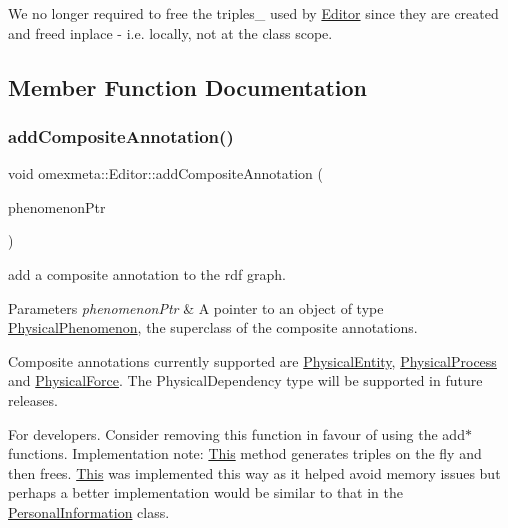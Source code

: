 We no longer required to free the triples\+\_\+ used by \hyperlink{classomexmeta_1_1Editor}{Editor} since they are created and freed inplace -\/ i.\+e. locally, not at the class scope. 

\subsection{Member Function Documentation}
\mbox{\label{classomexmeta_1_1Editor_a146ae84fb44991d9c6135e98f03fa972}} 
\subsubsection{\texorpdfstring{add\+Composite\+Annotation()}{addCompositeAnnotation()}}
{\footnotesize\ttfamily void omexmeta\+::\+Editor\+::add\+Composite\+Annotation (\begin{DoxyParamCaption}\item[{\hyperlink{classomexmeta_1_1PhysicalPhenomenon}{Physical\+Phenomenon} $\ast$}]{phenomenon\+Ptr }\end{DoxyParamCaption})}



add a composite annotation to the rdf graph. 


\begin{DoxyParams}{Parameters}
{\em phenomenon\+Ptr} & A pointer to an object of type \hyperlink{classomexmeta_1_1PhysicalPhenomenon}{Physical\+Phenomenon}, the superclass of the composite annotations.\\
\hline
\end{DoxyParams}
Composite annotations currently supported are \hyperlink{classomexmeta_1_1PhysicalEntity}{Physical\+Entity}, \hyperlink{classomexmeta_1_1PhysicalProcess}{Physical\+Process} and \hyperlink{classomexmeta_1_1PhysicalForce}{Physical\+Force}. The Physical\+Dependency type will be supported in future releases.

For developers. Consider removing this function in favour of using the add$\ast$ functions. Implementation note\+: \hyperlink{classThis}{This} method generates triples on the fly and then frees. \hyperlink{classThis}{This} was implemented this way as it helped avoid memory issues but perhaps a better implementation would be similar to that in the \hyperlink{classomexmeta_1_1PersonalInformation}{Personal\+Information} class.\mbox{\label{classomexmeta_1_1Editor_a9c8b060005146f3cf5a231ea6789e7d7}} 
